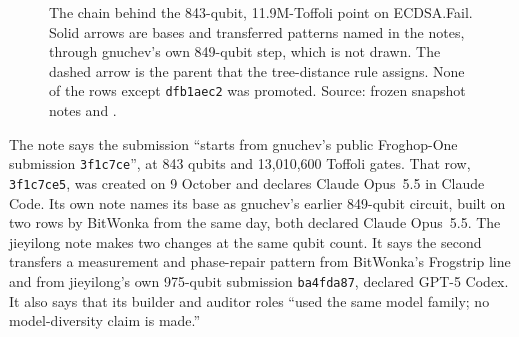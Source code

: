 \begin{figure}[t]
\centering
{}
\caption{The chain behind the 843-qubit, 11.9M-Toffoli point on ECDSA.Fail. Solid arrows are bases and transferred patterns named in the notes, through gnuchev's own 849-qubit step, which is not drawn. The dashed arrow is the parent that the tree-distance rule assigns. None of the rows except \texttt{dfb1aec2} was promoted. Source: frozen snapshot notes and .}
\label{fig:case843}
\end{figure}

The note says the submission ``starts from gnuchev's public Froghop-One submission \texttt{3f1c7ce}'', at 843 qubits and 13,010,600 Toffoli gates.
That row, \texttt{3f1c7ce5}, was created on 9 October and declares Claude Opus~5.5 in Claude Code.
Its own note names its base as gnuchev's earlier 849-qubit circuit, built on two rows by BitWonka from the same day, both declared Claude Opus~5.5.
The jieyilong note makes two changes at the same qubit count.
It says the second transfers a measurement and phase-repair pattern from BitWonka's Frogstrip line and from jieyilong's own 975-qubit submission \texttt{ba4fda87}, declared GPT-5 Codex.
It also says that its builder and auditor roles ``used the same model family; no model-diversity claim is made.''

